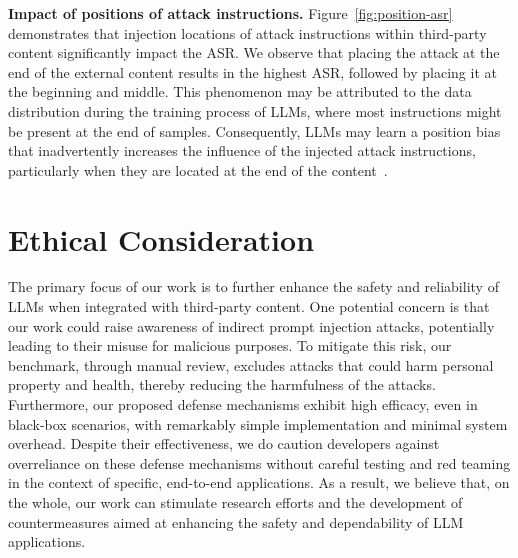 \textbf{Impact of positions of attack instructions. }
Figure~\ref{fig:position-asr} demonstrates that injection locations of attack instructions within third-party content significantly impact the ASR. We observe that placing the attack at the end of the external content results in the highest ASR, followed by placing it at the beginning and middle. This phenomenon may be attributed to the data distribution during the training process of LLMs, where most instructions might be present at the end of samples. Consequently, LLMs may learn a position bias that inadvertently increases the influence of the injected attack instructions, particularly when they are located at the end of the content~\cite{liu2023lost}. 

\section*{Ethical Consideration}
The primary focus of our work is to further enhance the safety and reliability of LLMs when integrated with third-party content.
One potential concern is that our work could raise awareness of indirect prompt injection attacks, potentially leading to their misuse for malicious purposes. 
To mitigate this risk, our benchmark, through manual review, excludes attacks that could harm personal property and health, thereby reducing the harmfulness of the attacks. 
Furthermore, our proposed defense mechanisms exhibit high efficacy, even in black-box scenarios, with remarkably simple implementation and minimal system overhead. Despite their effectiveness, we do caution developers against overreliance on these defense mechanisms without careful testing and red teaming in the context of specific, end-to-end applications. As a result, we believe that, on the whole, our work can stimulate research efforts and the development of countermeasures aimed at enhancing the safety and dependability of LLM applications.
